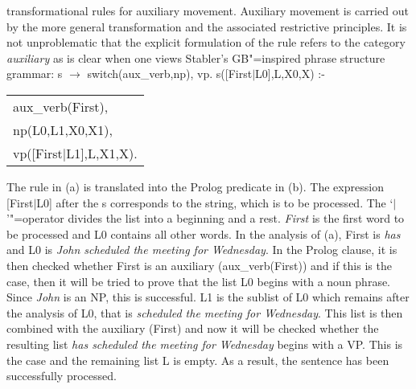 transformational rules for auxiliary movement. Auxiliary movement is carried out by the more general transformation \movealpha and
the associated restrictive principles. It is not unproblematic that the explicit formulation of the rule refers to the category \emph{auxiliary}
as is clear when one views Stabler's GB"=inspired phrase structure grammar: 
\eal
\ex\label{Regel-Aux-inv-Stabler} s $\to$ switch(aux\_verb,np), vp.
\ex s([First$|$L0],L,X0,X) :- \begin{tabular}[t]{@{}l@{}}
                              aux\_verb(First),\\
                              np(L0,L1,X0,X1),\\
                              vp([First$|$L1],L,X1,X).\\
                              \end{tabular}
\zl
%
The rule in (a) is translated into the Prolog predicate in (b). The expression [First$|$L0] after the s corresponds to the string, which
is to be processed. The `$|$'"=operator divides the list into a beginning and a rest. \emph{First} is the first word to be processed
and L0 contains all other words. In the analysis of (a), First is \emph{has} and L0 is \emph{John scheduled the meeting for Wednesday}.
In the Prolog clause, it is then checked whether First is an auxiliary (aux\_verb(First)) and if
this is the case, then it will be tried to prove that the list L0 begins with a noun phrase. Since \emph{John} is an NP, this is successful. L1 is the sublist of L0 which remains after the analysis of L0, that is
\emph{scheduled the meeting for Wednesday}. This list is then combined with the auxiliary (First) and now it will be checked whether the resulting
list \emph{has scheduled the meeting for Wednesday} begins with a VP. This is the case and the remaining list L is empty. As a result, the
sentence has been successfully processed.

